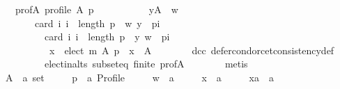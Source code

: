 \begin{isabellebody}
\ \ \ \ \ \ prof{\isacharunderscore}{\kern0pt}A{\isacharcolon}{\kern0pt}\ {\isachardoublequoteopen}profile\ A\ p{\isachardoublequoteclose}\isanewline
\ \ \ \ \isamarkupfalse%
\isanewline
\ \ \ \ \ \ {\isachardoublequoteopen}{\isasymforall}y{\isasymin}A\ {\isacharminus}{\kern0pt}\ {\isacharbraceleft}{\kern0pt}w{\isacharbraceright}{\kern0pt}{\isachardot}{\kern0pt}\isanewline
\ \ \ \ \ \ \ \ \ \ card\ {\isacharbraceleft}{\kern0pt}i{\isachardot}{\kern0pt}\ i\ {\isacharless}{\kern0pt}\ length\ p\ {\isasymand}\ {\isacharparenleft}{\kern0pt}w{\isacharcomma}{\kern0pt}\ y{\isacharparenright}{\kern0pt}\ {\isasymin}\ {\isacharparenleft}{\kern0pt}p{\isacharbang}{\kern0pt}i{\isacharparenright}{\kern0pt}{\isacharbraceright}{\kern0pt}\ {\isacharless}{\kern0pt}\isanewline
\ \ \ \ \ \ \ \ \ \ \ \ card\ {\isacharbraceleft}{\kern0pt}i{\isachardot}{\kern0pt}\ i\ {\isacharless}{\kern0pt}\ length\ p\ {\isasymand}\ {\isacharparenleft}{\kern0pt}y{\isacharcomma}{\kern0pt}\ w{\isacharparenright}{\kern0pt}\ {\isasymin}\ {\isacharparenleft}{\kern0pt}p{\isacharbang}{\kern0pt}i{\isacharparenright}{\kern0pt}{\isacharbraceright}{\kern0pt}\ {\isasymLongrightarrow}\isanewline
\ \ \ \ \ \ \ \ \ \ \ \ \ x\ {\isasymin}\ elect\ m\ A\ p\ {\isasymLongrightarrow}\ x\ {\isasymin}\ A{\isachardoublequoteclose}\isanewline
\ \ \ \ \ \ \isamarkupfalse%
\ dcc\ defer{\isacharunderscore}{\kern0pt}condorcet{\isacharunderscore}{\kern0pt}consistency{\isacharunderscore}{\kern0pt}def\isanewline
\ \ \ \ \ \ \ \ \ \ \ \ elect{\isacharunderscore}{\kern0pt}in{\isacharunderscore}{\kern0pt}alts\ subset{\isacharunderscore}{\kern0pt}eq\ finite\ prof{\isacharunderscore}{\kern0pt}A\isanewline
\ \ \ \ \ \ \isamarkupfalse%
\ metis\isanewline
\ \ \isamarkupfalse%
\isanewline
{}\isamarkupfalse%
\isanewline
\ \ \isamarkupfalse%
\isanewline
\ \ \ \ A\ {\isacharcolon}{\kern0pt}{\isacharcolon}{\kern0pt}\ {\isachardoublequoteopen}{\isacharprime}{\kern0pt}a\ set{\isachardoublequoteclose}\ \isanewline
\ \ \ \ p\ {\isacharcolon}{\kern0pt}{\isacharcolon}{\kern0pt}\ {\isachardoublequoteopen}{\isacharprime}{\kern0pt}a\ Profile{\isachardoublequoteclose}\ \isanewline
\ \ \ \ w\ {\isacharcolon}{\kern0pt}{\isacharcolon}{\kern0pt}\ {\isachardoublequoteopen}{\isacharprime}{\kern0pt}a{\isachardoublequoteclose}\ \isanewline
\ \ \ \ x\ {\isacharcolon}{\kern0pt}{\isacharcolon}{\kern0pt}\ {\isachardoublequoteopen}{\isacharprime}{\kern0pt}a{\isachardoublequoteclose}\ \isanewline
\ \ \ \ xa\ {\isacharcolon}{\kern0pt}{\isacharcolon}{\kern0pt}\ {\isachardoublequoteopen}{\isacharprime}{\kern0pt}a{\isachardoublequoteclose}\isanewline

\end{isabellebody}
